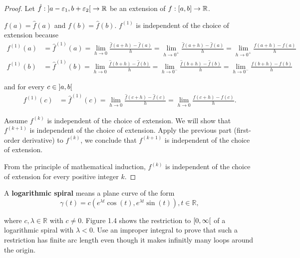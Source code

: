 \begin{proof}
	Let $\hat{f}: \left]{a - \varepsilon_{1}, b + \varepsilon_{2}}\right[ \to \mathbb{R}$ be an extension of $f: \left[{a, b}\right] \to \mathbb{R}$.

	$f(a) = \hat{f}(a)$ and $f(b) = \hat{f}(b)$. $f^{(1)}$ is independent of the choice of extension because
	\begin{align*}
		f^{(1)}(a) & = {\hat{f}}^{(1)}(a) = \lim\limits_{h\to 0}\frac{\hat{f}(a + h) - \hat{f}(a)}{h} = \lim\limits_{h \to 0^{+}}\frac{\hat{f}(a + h) - \hat{f}(a)}{h} = \lim\limits_{h \to 0^{+}}\frac{f(a + h) - f(a)}{h} \\
		f^{(1)}(b) & = {\hat{f}^{(1)}}(b) = \lim\limits_{h\to 0}\frac{\hat{f}(b + h) - \hat{f}(b)}{h} = \lim\limits_{h\to 0^{-}}\frac{\hat{f}(b + h) - \hat{f}(b)}{h} = \lim\limits_{h\to 0^{-}}\frac{f(b + h) - f(b)}{h}
	\end{align*}

	and for every $c \in \left]{a,b}\right[$
	\begin{align*}
		f^{(1)}(c) & = {\hat{f}}^{(1)}(c) = \lim\limits_{h\to 0}\frac{\hat{f}(c + h) - \hat{f}(c)}{h} = \lim\limits_{h\to 0}\frac{f(c + h) - f(c)}{h}.
	\end{align*}

	Assume $f^{(k)}$ is independent of the choice of extension. We will show that $f^{(k+1)}$ is independent of the choice of extension. Apply the previous part (first-order derivative) to $f^{(k)}$, we conclude that $f^{(k+1)}$ is independent of the choice of extension.

	From the principle of mathematical induction, $f^{(k)}$ is independent of the choice of extension for every positive integer $k$.
\end{proof}

\begin{exercise}{1.3}\label{exercise:1.3}
	A \textbf{logarithmic spiral} means a plane curve of the form
	\begin{equation*}
		\gamma(t) = c(e^{\lambda t}\cos(t), e^{\lambda t}\sin(t)), t \in \mathbb{R},
	\end{equation*}

	where $c, \lambda \in \mathbb{R}$ with $c\ne 0$. Figure 1.4 shows the restriction to $\left[{0, \infty}\right[$ of a logarithmic spiral with $\lambda < 0$. Use an improper integral to prove that such a restriction has finite arc length even though it makes infinitly many loops around the origin.
\end{exercise}

